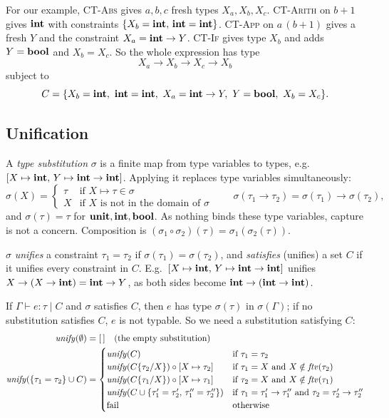 For our example, \textsc{CT-Abs} gives $a, b, c$ fresh types $X_a, X_b, X_c$.
\textsc{CT-Arith} on $b + 1$ gives $\mathbf{int}$ with constraints
$\{X_b = \mathbf{int},\, \mathbf{int} = \mathbf{int}\}$. \textsc{CT-App} on $a\,(b+1)$ gives a
fresh $Y$ and the constraint $X_a = \mathbf{int} \to Y$. \textsc{CT-If} gives type $X_b$
and adds $Y = \mathbf{bool}$ and $X_b = X_c$. So the whole expression has type
\[
X_a \to X_b \to X_c \to X_b
\]
subject to
\[
C = \{X_b = \mathbf{int},\ \mathbf{int} = \mathbf{int},\ X_a = \mathbf{int} \to Y,\ Y = \mathbf{bool},\ X_b = X_c\}.
\]

\subsection{Unification}

A \emph{type substitution} $\sigma$ is a finite map from type variables to types,
e.g.\ $[X \mapsto \mathbf{int},\, Y \mapsto \mathbf{int} \to \mathbf{int}]$. Applying it replaces
type variables simultaneously:
\[
\sigma(X) =
\begin{cases}
\tau & \text{if } X \mapsto \tau \in \sigma \\
X & \text{if } X \text{ is not in the domain of } \sigma
\end{cases}
\qquad
\sigma(\tau_1 \to \tau_2) = \sigma(\tau_1) \to \sigma(\tau_2),
\]
and $\sigma(\tau) = \tau$ for $\mathbf{unit}, \mathbf{int}, \mathbf{bool}$. As nothing binds
these type variables, capture is not a concern. Composition is
$(\sigma_1 \circ \sigma_2)(\tau) = \sigma_1(\sigma_2(\tau))$.

$\sigma$ \emph{unifies} a constraint $\tau_1 = \tau_2$ if $\sigma(\tau_1) =
\sigma(\tau_2)$, and \emph{satisfies} (unifies) a set $C$ if it unifies every
constraint in $C$. E.g.\ $[X \mapsto \mathbf{int},\, Y \mapsto \mathbf{int} \to \mathbf{int}]$
unifies $X \to (X \to \mathbf{int}) = \mathbf{int} \to Y$, as both sides become
$\mathbf{int} \to (\mathbf{int} \to \mathbf{int})$.

If $\Gamma \vdash e : \tau \mid C$ and $\sigma$ satisfies $C$, then $e$ has type
$\sigma(\tau)$ in $\sigma(\Gamma)$; if no substitution satisfies $C$, $e$ is not
typable. So we need a substitution satisfying $C$:
\begin{align*}
\mathit{unify}(\emptyset) &= [\,] \quad \text{(the empty substitution)} \\
\mathit{unify}(\{\tau_1 = \tau_2\} \cup C) &=
\begin{cases}
\mathit{unify}(C) & \text{if } \tau_1 = \tau_2 \\
\mathit{unify}(C\{\tau_2/X\}) \circ [X \mapsto \tau_2] & \text{if } \tau_1 = X \text{ and } X \notin \mathit{ftv}(\tau_2) \\
\mathit{unify}(C\{\tau_1/X\}) \circ [X \mapsto \tau_1] & \text{if } \tau_2 = X \text{ and } X \notin \mathit{ftv}(\tau_1) \\
\mathit{unify}(C \cup \{\tau_1' = \tau_2',\, \tau_1'' = \tau_2''\}) & \text{if } \tau_1 = \tau_1' \to \tau_1'' \text{ and } \tau_2 = \tau_2' \to \tau_2'' \\
\text{fail} & \text{otherwise}
\end{cases}
\end{align*}

